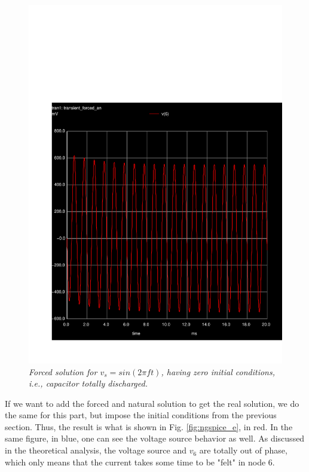 \vspace{-13mm}
\begin{figure}[H]
    \centering
    \includegraphics[width = 0.85\linewidth]{../sim/trans4.pdf}
        \caption{\textit{Forced solution for $v_s = sin(2\pi ft)$, having zero initial conditions, i.e., capacitor totally discharged.}}
    \label{fig:ngspice_d}
\end{figure}

If we want to add the forced and natural solution to get the real solution, we do the same for this part, but impose the initial conditions from the previous section. Thus, the result is what is shown in Fig. \ref{fig:ngspice_e}, in red. In the same figure, in blue, one can see the voltage source behavior as well. As discussed in the theoretical analysis, the voltage source and $v_6$ are totally out of phase, which only means that the current takes some time to be "felt" in node 6.

